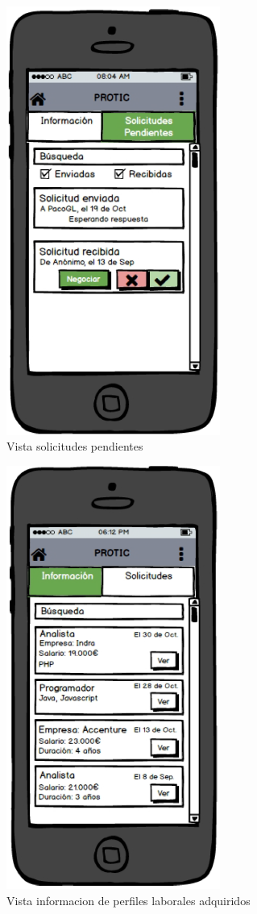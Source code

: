 \documentclass[a4paper, 12pt]{book}
\begin{document}
    \begin{figure}
        \centering
        \includegraphics[width=7cm, keepaspectratio]{img/old_vista_solicitudes_pendientes.PNG}
        \caption{Vista solicitudes pendientes}
    \end{figure}

    \begin{figure}
        \centering
        \includegraphics[width=7cm, keepaspectratio]{img/old_vista_informacion_de_perfiles_laborales_adquiridos.PNG}
        \caption{Vista informacion de perfiles laborales adquiridos}
    \end{figure}
\end{document}
